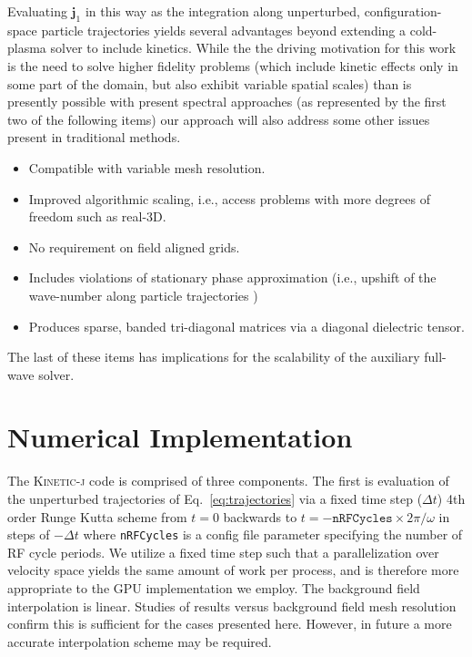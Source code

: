 \documentclass[final,5p,times,twocolumn]{elsarticle}
\renewcommand{\vec}[1]{\mathbf{#1}}
\newcommand{\kj}{\textsc{Kinetic-j}\xspace}
\newcommand{\jp}{\ensuremath{\vec{j}_{\mathrm{1}}}\xspace}
\begin{document}
Evaluating $\jp$ in this way as the integration along unperturbed, configuration-space particle trajectories yields several advantages beyond extending a cold-plasma solver to include kinetics. While the the driving motivation for this work is the need to solve higher fidelity problems (which include kinetic effects only in some part of the domain, but also exhibit variable spatial scales) than is presently possible with present spectral approaches (as represented by the first two of the following items) our approach will also address some other issues present in traditional methods. 
%
\begin{itemize}
\item{Compatible with variable mesh resolution.}
\item{Improved algorithmic scaling, i.e., access problems with more degrees of freedom such as real-3D.}
\item{No requirement on field aligned grids.}
\item{Includes violations of stationary phase approximation (i.e., upshift of the wave-number along particle trajectories \cite[]{berry2016})}
\item{Produces sparse, banded tri-diagonal matrices via a diagonal dielectric tensor.}
\end{itemize}
%
The last of these items has implications for the scalability of the auxiliary full-wave solver.
%
\section{Numerical Implementation}
\label{section:implementation}
%
The \kj code is comprised of three components. The first is evaluation of the unperturbed trajectories of Eq.~\ref{eq:trajectories} via a fixed time step ($\Delta t$) 4th order Runge Kutta scheme from $t=0$ backwards to $t=-\texttt{nRFCycles}\times{2\pi}/\omega$ in steps of $-\Delta t$ where \texttt{nRFCycles} is a config file parameter specifying the number of RF cycle periods. We utilize a fixed time step such that a parallelization over velocity space yields the same amount of work per process, and is therefore more appropriate to the GPU implementation we employ. The background field interpolation is linear. Studies of results versus background field mesh resolution confirm this is sufficient for the cases presented here. However, in future a more accurate interpolation scheme may be required.
\end{document}
